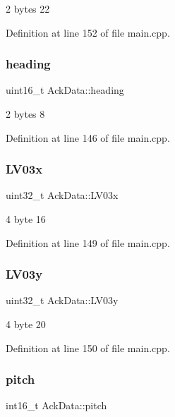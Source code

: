 2 bytes 22 



Definition at line 152 of file main.\+cpp.

\mbox{\label{structAckData_a66b0ebcdeb3e0e59bcef03b1d4016950}} 
\subsubsection{\texorpdfstring{heading}{heading}}
{\footnotesize\ttfamily uint16\+\_\+t Ack\+Data\+::heading}



2 bytes 8 



Definition at line 146 of file main.\+cpp.

\mbox{\label{structAckData_a954849d2888715136c6e5cc2e9808ad5}} 
\subsubsection{\texorpdfstring{LV03x}{LV03x}}
{\footnotesize\ttfamily uint32\+\_\+t Ack\+Data\+::\+L\+V03x}



4 byte 16 



Definition at line 149 of file main.\+cpp.

\mbox{\label{structAckData_a1111544b84d5ecfa27f168d988e28b8f}} 
\subsubsection{\texorpdfstring{LV03y}{LV03y}}
{\footnotesize\ttfamily uint32\+\_\+t Ack\+Data\+::\+L\+V03y}



4 byte 20 



Definition at line 150 of file main.\+cpp.

\mbox{\label{structAckData_a1bbf988ac7e1bf34f0d932c5cfa10740}} 
\subsubsection{\texorpdfstring{pitch}{pitch}}
{\footnotesize\ttfamily int16\+\_\+t Ack\+Data\+::pitch}



